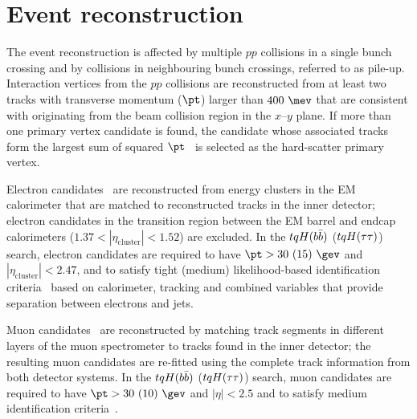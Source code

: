 
\section{Event reconstruction}
\label{sec:objects}

The event reconstruction is affected by multiple $pp$ collisions in a single bunch crossing and by collisions
in neighbouring bunch crossings, referred to as pile-up. 
Interaction vertices from the $pp$ collisions are reconstructed from at least two tracks 
with transverse momentum ($\pt$) larger than $400~\mev$ that are consistent with originating from the 
beam collision region in the $x$--$y$ plane. If more than one primary vertex candidate is found, the
candidate whose associated tracks form the largest sum of squared $\pt$~\cite{ATL-PHYS-PUB-2015-026}
is selected as the hard-scatter primary vertex.

Electron candidates~\cite{ATLAS-CONF-2016-024,ATL-PHYS-PUB-2016-015} are reconstructed from energy 
clusters in the EM calorimeter that are matched to reconstructed tracks in the inner detector;
electron candidates in the transition region between the EM barrel and endcap calorimeters 
($1.37 < |\eta_{\textrm{cluster}}| < 1.52$) are excluded.
In the $tqH(b\bar{b})$ ($tqH(\tau\tau)$) search, electron candidates are required to have $\pt>30~(15)~\gev$ and 
$|\eta_{\textrm{cluster}}| < 2.47$, and to satisfy tight (medium) likelihood-based identification 
criteria~\cite{ATLAS-CONF-2016-024} based on calorimeter, tracking and combined variables that provide 
separation between electrons and jets. 

Muon candidates~\cite{Aad:2016jkr} are reconstructed by matching track segments in %
different layers of the muon spectrometer to tracks found in the inner detector;
the resulting muon candidates are re-fitted using the complete track information from both detector systems.
In the $tqH(b\bar{b})$ ($tqH(\tau\tau)$) search, muon candidates are required to have $\pt>30~(10)~\gev$ and $|\eta|<2.5$ 
and to satisfy medium identification criteria~\cite{Aad:2016jkr}. 

